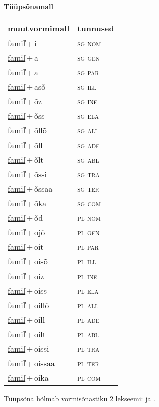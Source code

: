 
\vspace{1.8em}
\begin{minipage}{\textwidth}
\textbf{Tüüpsõnamall \,}\\

\begin{sideways}
\begin{tabular}{l l}
muutvormimall & tunnused \\
\hline
\underline{famil̕}\,+\,i & \textsc{ sg nom } \\
\underline{famil̕}\,+\,a & \textsc{ sg gen } \\
\underline{famil̕}\,+\,a & \textsc{ sg par } \\
\underline{famil̕}\,+\,asõ & \textsc{ sg ill } \\
\underline{famil̕}\,+\,õz & \textsc{ sg ine } \\
\underline{famil̕}\,+\,õss & \textsc{ sg ela } \\
\underline{famil̕}\,+\,õllõ & \textsc{ sg all } \\
\underline{famil̕}\,+\,õll & \textsc{ sg ade } \\
\underline{famil̕}\,+\,õlt & \textsc{ sg abl } \\
\underline{famil̕}\,+\,õssi & \textsc{ sg tra } \\
\underline{famil̕}\,+\,õssaa & \textsc{ sg ter } \\
\underline{famil̕}\,+\,õka & \textsc{ sg com } \\
\underline{famil̕}\,+\,õd & \textsc{ pl nom } \\
\underline{famil̕}\,+\,ojõ & \textsc{ pl gen } \\
\underline{famil̕}\,+\,oit & \textsc{ pl par } \\
\underline{famil̕}\,+\,oisõ & \textsc{ pl ill } \\
\underline{famil̕}\,+\,oiz & \textsc{ pl ine } \\
\underline{famil̕}\,+\,oiss & \textsc{ pl ela } \\
\underline{famil̕}\,+\,oillõ & \textsc{ pl all } \\
\underline{famil̕}\,+\,oill & \textsc{ pl ade } \\
\underline{famil̕}\,+\,oilt & \textsc{ pl abl } \\
\underline{famil̕}\,+\,oissi & \textsc{ pl tra } \\
\underline{famil̕}\,+\,oissaa & \textsc{ pl ter } \\
\underline{famil̕}\,+\,oika & \textsc{ pl com } \\
\end{tabular}
\end{sideways}
\label{tab:tüüpsõnamall-famil̕i}

\end{minipage}

 
\vspace{1em}
\noindent Tüüpsõna hõlmab vormisõnastiku 2 lekseemi:  ja .
